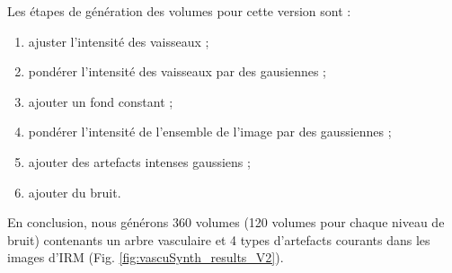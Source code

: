 Les étapes de génération des volumes pour cette version sont :

\begin{enumerate}
  \item ajuster l'intensité des vaisseaux ;
  \item pondérer l'intensité des vaisseaux par des gausiennes ;
  \item ajouter un fond constant ; 
  \item pondérer l'intensité de l'ensemble de l'image par des gaussiennes ;
  \item ajouter des artefacts intenses gaussiens ;
  \item ajouter du bruit.
  \end{enumerate}

En conclusion, nous générons 360 volumes (120 volumes pour chaque niveau de bruit) contenants un arbre vasculaire et 4 types d'artefacts courants dans les images d'IRM (Fig. \ref{fig:vascuSynth_results_V2}).

